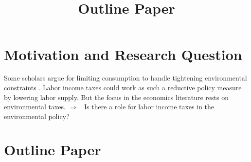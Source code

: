 \documentclass[12pt]{article}
\title{Outline Paper}
\newcommand{\ar}{$\Rightarrow$ \ }
\begin{document}
	\maketitle
	\section{Motivation and Research Question}
		Some scholars argue for limiting consumption to handle tightening environmental constraints \citep{Schor2005SustainableReductionb, VanVuuren2018AlternativeTechnologies}. Labor income taxes could work as such a reductive policy measure by lowering labor supply.
		But the focus in the economics literature rests on environmental taxes. 
\ar Is there a role for labor income taxes in the environmental policy?

\section{Outline Paper}
\end{document}
